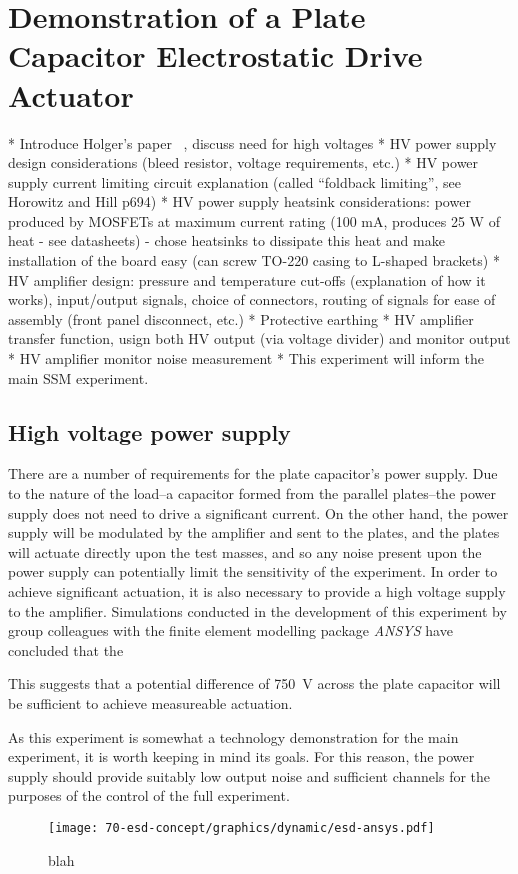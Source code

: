 \chapter{Demonstration of a Plate Capacitor Electrostatic Drive Actuator}
\label{c:esd-concept}

* Introduce Holger's paper~\cite{Wittel2015} \etal, discuss need for high voltages
* HV power supply design considerations (bleed resistor, voltage requirements, etc.)
* HV power supply current limiting circuit explanation (called ``foldback limiting'', see Horowitz and Hill p694)
* HV power supply heatsink considerations: power produced by MOSFETs at maximum current rating (100 mA, produces 25 W of heat - see datasheets) - chose heatsinks to dissipate this heat and make installation of the board easy (can screw TO-220 casing to L-shaped brackets)
* HV amplifier design: pressure and temperature cut-offs (explanation of how it works), input/output signals, choice of connectors, routing of signals for ease of assembly (front panel disconnect, etc.)
* Protective earthing
* HV amplifier transfer function, usign both HV output (via voltage divider) and monitor output
* HV amplifier monitor noise measurement
* This experiment will inform the main SSM experiment.

\section{High voltage power supply}
There are a number of requirements for the plate capacitor's power supply. Due to the nature of the load--a capacitor formed from the parallel plates--the power supply does not need to drive a significant current. On the other hand, the power supply will be modulated by the amplifier and sent to the plates, and the plates will actuate directly upon the test masses, and so any noise present upon the power supply can potentially limit the sensitivity of the experiment. In order to achieve significant actuation, it is also necessary to provide a high voltage supply to the amplifier. Simulations conducted in the development of this experiment by group colleagues with the finite element modelling package \emph{ANSYS} have concluded that the 

This suggests that a potential difference of \SI{750}{\volt} across the plate capacitor will be sufficient to achieve measureable actuation.

As this experiment is somewhat a technology demonstration for the main  experiment, it is worth keeping in mind its goals. For this reason, the power supply should provide suitably low output noise and sufficient channels for the purposes of the control of the full experiment.

\begin{figure}
  \begin{center}
    \texttt{[image: 70-esd-concept/graphics/dynamic/esd-ansys.pdf]}
    \label{fig:esd-ansys}
  \end{center}
  \caption{blah}
\end{figure}